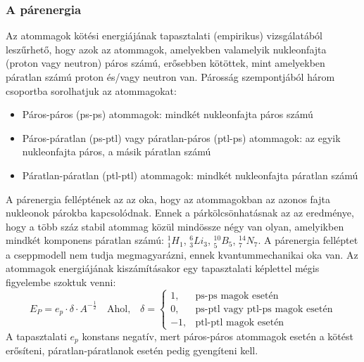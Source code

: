 \documentclass[../main.tex]{subfiles}
\begin{document}
\subsubsection*{A párenergia}
Az atommagok kötési energiájának tapasztalati (empirikus) vizsgálatából leszűrhető,
hogy azok az atommagok, amelyekben valamelyik nukleonfajta (proton vagy neutron)
páros számú, erősebben kötöttek, mint amelyekben páratlan számú proton és/vagy neutron van.
Párosság szempontjából három csoportba sorolhatjuk az atommagokat:
\begin{itemize}
    \item Páros-páros (ps-ps) atommagok: mindkét nukleonfajta páros számú
    \item Páros-páratlan (ps-ptl) vagy páratlan-páros (ptl-ps) atommagok: az egyik nukleonfajta páros, a másik páratlan számú
    \item Páratlan-páratlan (ptl-ptl) atommagok: mindkét nukleonfajta páratlan számú
\end{itemize}
A párenergia felléptének az az oka, hogy az atommagokban az azonos fajta nukleonok párokba kapcsolódnak. Ennek
a párkölcsönhatásnak az az eredménye, hogy a több száz stabil atommag közül mindössze
négy van olyan, amelyikben mindkét komponens páratlan számú: $^1_1H_1$, $^6_3Li_3$, $^{10}_5B_5$, $^{14}_7N_7$. 
A párenergia felléptet a cseppmodell nem tudja megmagyarázni, ennek kvantummechanikai
oka van. Az atommagok energiájának kiszámításakor egy tapasztalati képlettel mégis
figyelembe szoktuk venni:
\begin{equation}
    E_P = e_p \cdot \delta \cdot A^{-\frac{1}{2}} \quad \text{Ahol,} \quad \delta = \begin{cases}
        1, & \text{ps-ps magok esetén} \\
        0, & \text{ps-ptl vagy ptl-ps magok esetén} \\
        -1, & \text{ptl-ptl magok esetén}
    \end{cases}
\end{equation}
A tapasztalati $e_p$ konstans negatív, mert páros-páros atommagok esetén a kötést erősíteni, páratlan-páratlanok esetén pedig gyengíteni kell.
\end{document}
